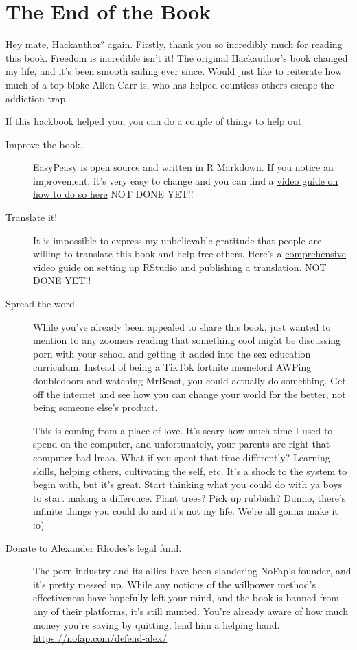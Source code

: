 \documentclass[
]{book}
\begin{document}
\hypertarget{the-end-of-the-book}{%
\chapter{The End of the Book}\label{the-end-of-the-book}}

Hey mate, Hackauthor² again. Firstly, thank you so incredibly much for reading this book. Freedom is incredible isn't it! The original Hackauthor's book changed my life, and it's been smooth sailing ever since. Would just like to reiterate how much of a top bloke Allen Carr is, who has helped countless others escape the addiction trap.

If this hackbook helped you, you can do a couple of things to help out:

\begin{description}
\item[Improve the book.]
EasyPeasy is open source and written in R Markdown. If you notice an improvement, it's very easy to change and you can find a \href{}{video guide on how to do so here} NOT DONE YET!!
\item[Translate it!]
It is impossible to express my unbelievable gratitude that people are willing to translate this book and help free others. Here's a \href{}{comprehensive video guide on setting up RStudio and publishing a translation.} NOT DONE YET!!
\item[Spread the word.]
While you've already been appealed to share this book, just wanted to mention to any zoomers reading that something cool might be discussing porn with your school and getting it added into the sex education curriculum. Instead of being a TikTok fortnite memelord AWPing doubledoors and watching MrBeast, you could actually do something. Get off the internet and see how you can change your world for the better, not being someone else's product.

This is coming from a place of love. It's scary how much time I used to spend on the computer, and unfortunately, your parents are right that computer bad lmao. What if you spent that time differently? Learning skills, helping others, cultivating the self, etc. It's a shock to the system to begin with, but it's great. Start thinking what you could do with ya boys to start making a difference. Plant trees? Pick up rubbish? Dunno, there's infinite things you could do and it's not my life. We're all gonna make it :o)
\item[Donate to Alexander Rhodes's legal fund.]
The porn industry and its allies have been slandering NoFap's founder, and it's pretty messed up. While any notions of the willpower method's effectiveness have hopefully left your mind, and the book is banned from any of their platforms, it's still munted. You're already aware of how much money you're saving by quitting, lend him a helping hand. \url{https://nofap.com/defend-alex/}
\end{description}
\end{document}
